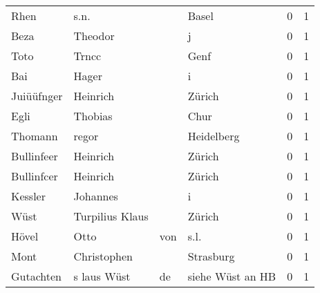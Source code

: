 \begin{center}
\begin{tiny}
\begin{longtabu}{llllrr}
                     Rhen &                               s.n. &             &                                       Basel &          0 &         1 \\
                     Beza &                            Theodor &             &                                           j &          0 &         1 \\
                     Toto &                              Trncc &             &                                        Genf &          0 &         1 \\
                      Bai &                              Hager &             &                                           i &          0 &         1 \\
               Juiüüfnger &                           Heinrich &             &                                      Zürich &          0 &         1 \\
                     Egli &                            Thobias &             &                                        Chur &          0 &         1 \\
                  Thomann &                              regor &             &                                  Heidelberg &          0 &         1 \\
               Bullinfeer &                           Heinrich &             &                                      Zürich &          0 &         1 \\
               Bullinfcer &                           Heinrich &             &                                      Zürich &          0 &         1 \\
                  Kessler &                           Johannes &             &                                           i &          0 &         1 \\
                     Wüst &                    Turpilius Klaus &             &                                      Zürich &          0 &         1 \\
                    Hövel &                               Otto &         von &                                        s.l. &          0 &         1 \\
                     Mont &                        Christophen &             &                                   Strasburg &          0 &         1 \\
                Gutachten &                        s laus Wüst &          de &                            siehe Wüst an HB &          0 &         1 \\

\end{longtabu}
\end{tiny}
\end{center}
